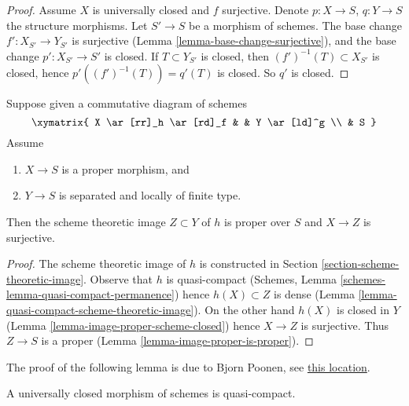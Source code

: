\begin{proof}
Assume $X$ is universally closed and $f$ surjective.
Denote $p : X \to S$, $q : Y \to S$ the structure morphisms.
Let $S' \to S$ be a morphism of schemes. The base change
$f' : X_{S'} \to Y_{S'}$ is surjective
(Lemma \ref{lemma-base-change-surjective}), and the base
change $p' : X_{S'} \to S'$ is closed.
If $T \subset Y_{S'}$ is closed, then $(f')^{-1}(T) \subset X_{S'}$
is closed, hence $p'((f')^{-1}(T)) = q'(T)$ is closed.
So $q'$ is closed.
\end{proof}

\begin{lemma}
\label{lemma-scheme-theoretic-image-is-proper}
Suppose given a commutative diagram of schemes
$$
\xymatrix{
X \ar[rr]_h \ar[rd]_f & & Y \ar[ld]^g \\
& S
}
$$
Assume
\begin{enumerate}
\item $X \to S$ is a proper morphism, and
\item $Y \to S$ is separated and locally of finite type.
\end{enumerate}
Then the scheme theoretic image $Z \subset Y$ of $h$
is proper over $S$ and $X \to Z$ is surjective.
\end{lemma}

\begin{proof}
The scheme theoretic image of $h$ is constructed in Section
\ref{section-scheme-theoretic-image}.
Observe that $h$ is quasi-compact
(Schemes, Lemma \ref{schemes-lemma-quasi-compact-permanence})
hence $h(X) \subset Z$
is dense (Lemma \ref{lemma-quasi-compact-scheme-theoretic-image}).
On the other hand $h(X)$ is closed in $Y$
(Lemma \ref{lemma-image-proper-scheme-closed})
hence $X \to Z$ is surjective.
Thus $Z \to S$ is a proper (Lemma \ref{lemma-image-proper-is-proper}).
\end{proof}

\noindent
The proof of the following lemma is due to Bjorn Poonen, see
\href{http://mathoverflow.net/questions/23337/is-a-universally-closed-morphism-of-schemes-quasi-compact/23528#23528}{this location}.

\begin{lemma}
\label{lemma-universally-closed-quasi-compact}
A universally closed morphism of schemes is quasi-compact.
\end{lemma}

